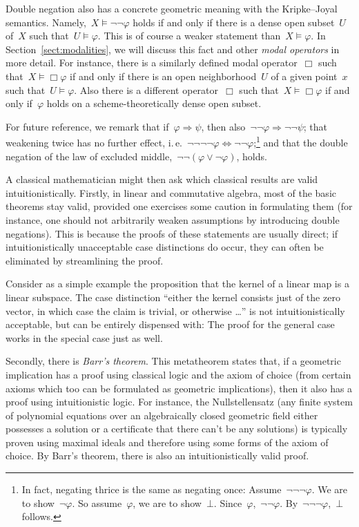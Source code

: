 \documentclass[10pt,reqno,a4paper]{amsbook}
\makeatletter
\theoremstyle{definition}
\theoremstyle{plain}
\theoremstyle{remark}
\newcommand{\?}{\,{:}\,}
\renewcommand{\_}{\mathpunct{.}\,}
\newcommand{\ie}{i.\,e.\@\xspace}
\makeatother
\begin{document}
Double negation also has a concrete geometric meaning with the
Kripke--Joyal semantics. Namely,~$X \models \neg\neg\varphi$ holds if and
only if there is a dense open subset~$U$ of~$X$ such that~$U \models \varphi$.
This is of course a weaker statement than~$X \models \varphi$.
In Section~\ref{sect:modalities}, we will discuss this fact and other
\emph{modal operators} in more detail. For instance, there is a similarly defined modal
operator~$\Box$ such that~$X \models \Box\varphi$ if and only if there is an
open neighborhood~$U$ of a given point~$x$ such that~$U \models \varphi$. Also
there is a different operator~$\Box$ such that~$X \models \Box\varphi$ if and only
if~$\varphi$ holds on a scheme-theoretically dense open subset.

For future reference, we remark that if~$\varphi \Rightarrow \psi$,
then also~$\neg\neg\varphi \Rightarrow \neg\neg\psi$; that weakening
twice has no further effect, \ie~$\neg\neg\neg\neg\varphi \Leftrightarrow
\neg\neg\varphi$;\footnote{In fact, negating thrice is the same as negating
once: Assume~$\neg\neg\neg\varphi$. We are to show~$\neg\varphi$. So
assume~$\varphi$, we are to show~$\bot$. Since~$\varphi$,~$\neg\neg\varphi$.
By~$\neg\neg\neg\varphi$,~$\bot$ follows.} and that the double negation of the
law of excluded middle,~$\neg\neg(\varphi \vee \neg\varphi)$, holds.

A classical mathematician might then ask which classical results are valid
intuitionistically. Firstly, in linear and commutative algebra, most
of the basic theorems stay valid, provided one exercises some caution in
formulating them (for instance, one should not arbitrarily weaken assumptions
by introducing double negations). This is because the proofs of these
statements are usually direct; if intuitionistically unacceptable case
distinctions do occur, they can often be eliminated by streamlining the proof.

Consider as a simple example the proposition that the kernel of a linear map is
a linear subspace. The case distinction ``either the kernel consists just of the
zero vector, in which case the claim is trivial, or otherwise \ldots'' is not
intuitionistically acceptable, but can be entirely dispensed with: The proof
for the general case works in the special case just as well.

Secondly, there is \emph{Barr's theorem}. This metatheorem states that, if a
geometric implication has a proof using classical logic and the axiom of choice
(from certain axioms which too can be formulated as geometric implications), then
it also has a proof using intuitionistic logic. For instance, the
Nullstellensatz (any finite system of polynomial equations over an
algebraically closed geometric field either possesses a solution or a
certificate that there can't be any solutions) is typically proven using
maximal ideals and therefore using some forms of the axiom of choice. By Barr's
theorem, there is also an intuitionistically valid proof.
\end{document}
